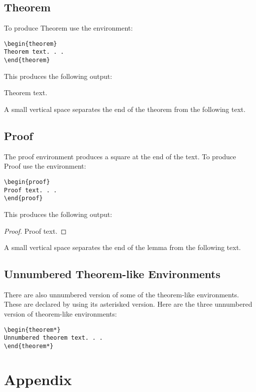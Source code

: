 \documentclass{clv3}
\begin{document}
\subsection{Theorem}

To produce Theorem use the environment:

\begin{verbatim}
\begin{theorem}
Theorem text. . .
\end{theorem}
\end{verbatim}

This produces the following output:
\begin{theorem}\label{thm}
Theorem text.
\end{theorem}
\noindent
A small vertical space separates the end of the theorem
from the following text.

\subsection{Proof}

The proof environment produces a square at the end of the text. To produce Proof
use the environment:

\begin{verbatim}
\begin{proof}
Proof text. . .
\end{proof}
\end{verbatim}

This produces the following output:
\begin{proof}\label{proof}
Proof text.
\end{proof}
A small vertical space separates the end of the lemma
from the following text.

\subsection{Unnumbered Theorem-like Environments}

There are also unnumbered version of some of the theorem-like environments.
These are declared by using its asterisked version. Here are the three
unnumbered version of theorem-like environments:

\begin{verbatim}
\begin{theorem*}
Unnumbered theorem text. . .
\end{theorem*}
\end{verbatim}

\section{Appendix}
\end{document}
